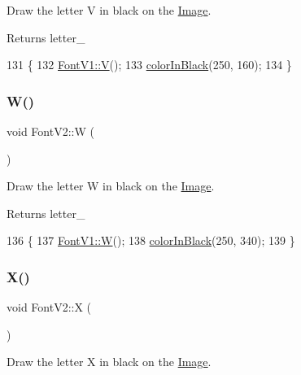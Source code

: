 Draw the letter V in black on the \mbox{\hyperlink{class_image}{Image}}. 

\begin{DoxyReturn}{Returns}
letter\+\_\+ 
\end{DoxyReturn}

\begin{DoxyCode}
131                \{
132     \mbox{\hyperlink{class_font_v1_aa5937063bd49c25ccd8993d375926fb7}{FontV1::V}}();
133     \mbox{\hyperlink{class_font_v2_a04f2501961bc286ce70fbb6a840b0e8a}{colorInBlack}}(250, 160);
134 \}
\end{DoxyCode}
\mbox{\label{class_font_v2_abb6c182459f9a1a20c4d6a85d09b1b1d}} 
\subsubsection{\texorpdfstring{W()}{W()}}
{\footnotesize\ttfamily void Font\+V2\+::W (\begin{DoxyParamCaption}{ }\end{DoxyParamCaption})}



Draw the letter W in black on the \mbox{\hyperlink{class_image}{Image}}. 

\begin{DoxyReturn}{Returns}
letter\+\_\+ 
\end{DoxyReturn}

\begin{DoxyCode}
136                \{
137     \mbox{\hyperlink{class_font_v1_aa4e67840b676dfffd3e03d873013174c}{FontV1::W}}();
138     \mbox{\hyperlink{class_font_v2_a04f2501961bc286ce70fbb6a840b0e8a}{colorInBlack}}(250, 340);
139 \}
\end{DoxyCode}
\mbox{\label{class_font_v2_a63545ba2652b9559d8d171c5bd37fbea}} 
\subsubsection{\texorpdfstring{X()}{X()}}
{\footnotesize\ttfamily void Font\+V2\+::X (\begin{DoxyParamCaption}{ }\end{DoxyParamCaption})}



Draw the letter X in black on the \mbox{\hyperlink{class_image}{Image}}. 

